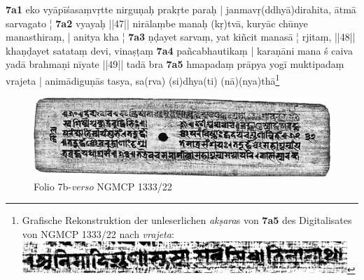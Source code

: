 \documentclass[a4paper,12pt]{article}
\begin{document}
{\begin{flushleft}
\noindent
\textbf{7a1} eko vyāpīśasaṃvṛtte nirguṇaḥ prakṛte paraḥ | janmavṛ(ddhyā)dirahita, ātmā sarvagato ¦ \linebreak
\textbf{7a2} vyayaḥ ||47|| nirālaṃbe manaḥ  (kṛ)tvā, kuryāc chūnye manasthiraṃ, | anitya kha ¦ \linebreak
\textbf{7a3} ṇḍayet sarvaṃ, yat kiñcit manasā ¦  rjitaṃ, ||48|| khaṇḍayet satataṃ devi, vinaṣṭaṃ \linebreak
\textbf{7a4} pañcabhautikaṃ | karaṇāni mana  ś caiva yadā brahmaṇi nīyate ||49|| tadā bra \linebreak
\textbf{7a5} hmapadaṃ prāpya yogī muktipadaṃ vrajeta | animādiguṇās tasya, sa(rva) (si)dhya(ti) (nā)(nya)thā\footnote{Grafische Rekonstruktion der unleserlichen \textit{akṣara}s von \textbf{7a5} des Digitalisates von NGMCP 1333/22 nach \textit{vrajeta}: \includegraphics[height=12.0mm]{folio7a5-recon-sharp.png}} \linebreak
\end{flushleft}

 \begin{figure}[htbp] 
  \centering \includegraphics[width=1\textwidth]{7v.jpg}
  \caption{Folio 7b-\textit{verso} NGMCP 1333/22}
  \label{fig:Folio7b}
\end{figure}

}
\end{document}

